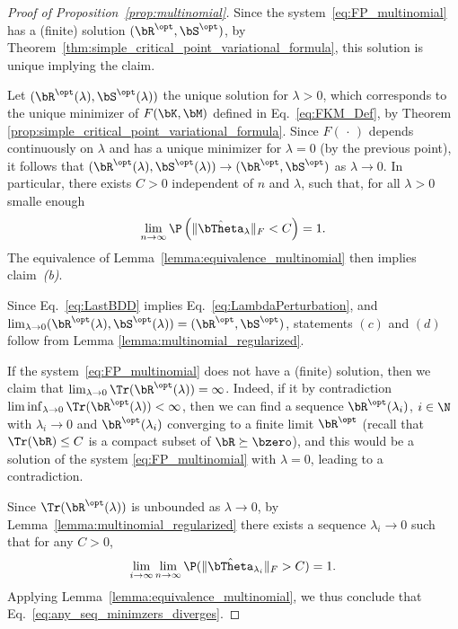 \begin{proof}[Proof of Proposition~\ref{prop:multinomial}]
Since the system~\eqref{eq:FP_multinomial} has a (finite) solution $(\bR^\opt,\bS^\opt)$,
by Theorem~\ref{thm:simple_critical_point_variational_formula}, this solution is unique implying the claim. 

Let $(\bR^\opt(\lambda),\bS^\opt(\lambda))$ the unique solution for $\lambda>0$,
which corresponds to the unique minimizer of $F(\bK,\bM)$ defined in 
Eq.~\eqref{eq:FKM_Def}, by Theorem \ref{prop:simple_critical_point_variational_formula}. Since $F(\,\cdot\, )$ depends continuously on $\lambda$
and has a unique minimizer for $\lambda=0$ (by the previous point), it follows that $(\bR^\opt(\lambda),\bS^\opt(\lambda)) \rightarrow (\bR^\opt,\bS^\opt)$ as $\lambda\to 0$.
In particular, there exists $C>0$ independent of $n$ and $\lambda$, such that,
for all $\lambda>0$ smalle enough
    \begin{equation}
         \lim_{n\to\infty} \P\left(\|\hat\bTheta_\lambda\|_F < C \right) = 1.\label{eq:LastBDD}
    \end{equation}
The equivalence of Lemma~\ref{lemma:equivalence_multinomial} then 
implies claim~\textit{(b)}.

Since Eq.~\eqref{eq:LastBDD} implies Eq.~\eqref{eq:LambdaPerturbation}, 
and $\lim_{\lambda\to 0}(\bR^\opt(\lambda),\bS^\opt(\lambda)) = (\bR^\opt,\bS^\opt)$,
statements $(c)$ and $(d)$ follow from Lemma \ref{lemma:multinomial_regularized}.


If  the system~\eqref{eq:FP_multinomial} does not have a (finite) solution,
then we claim that  $\lim_{\lambda\to 0}\Tr(\bR^\opt(\lambda))=\infty$.
Indeed, if it by contradiction $\lim\inf_{\lambda\to 0}\Tr(\bR^\opt(\lambda))<\infty$,
then we can find a sequence $\bR^{\opt}(\lambda_i)$, $i\in \N$ 
with $\lambda_i\to 0$ and $\bR^{\opt}(\lambda_i)$ converging to a finite
limit  $\bR^{\opt}$ (recall that $\Tr(\bR)\le C$ is a compact subset of $\bR\succeq \bzero$), and this would be a solution of the system \eqref{eq:FP_multinomial}
with $\lambda=0$, leading to a contradiction.

Since  $\Tr(\bR^\opt(\lambda))$  is unbounded as $\lambda\to 0$, by Lemma~\ref{lemma:multinomial_regularized} there exists a sequence $\lambda_i\to 0$ 
such that for any $C>0$,
\begin{equation}
   \lim_{i\to \infty} \lim_{n\to\infty} \P(\|\hat\bTheta_{\lambda_i}\|_F > C)  = 1.
\end{equation}
Applying Lemma~\ref{lemma:equivalence_multinomial}, 
we thus conclude that Eq.~\eqref{eq:any_seq_minimzers_diverges}.
\end{proof}



